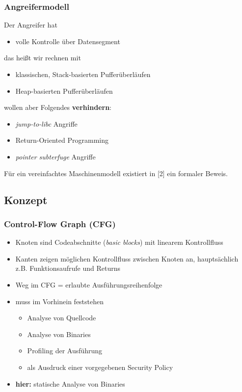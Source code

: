 \documentclass[mathserif,slidestop,compress,red]{beamer}
\begin{document}
\begin{frame}
  \frametitle{Angreifermodell}
  Der Angreifer hat
  \begin{itemize}
    \item volle Kontrolle über Datensegment
  \end{itemize}
  \pause
  das heißt wir rechnen mit
  \begin{itemize}
    \item klassischen, Stack-basierten Pufferüberläufen
    \item Heap-basierten Pufferüberläufen
  \end{itemize}
  \pause
  wollen aber Folgendes \textbf{verhindern}:
  \begin{itemize}
    \item \emph{jump-to-libc} Angriffe
    \item Return-Oriented Programming
    \item \emph{pointer subterfuge} Angriffe
  \end{itemize}
  \vspace{0.5em}
  Für ein vereinfachtes Maschinenmodell existiert in [2] ein formaler Beweis.
\end{frame}

\subsection{Konzept}

\begin{frame}
  \frametitle{Control-Flow Graph (CFG)}
  \begin{itemize}
    \item Knoten sind Codeabschnitte (\emph{basic blocks}) mit linearem Kontrollfluss
    \item Kanten zeigen möglichen Kontrollfluss zwischen Knoten an, hauptsächlich z.B. Funktionsaufrufe und Returns
    \item Weg im CFG = erlaubte Ausführungsreihenfolge
    \item muss im Vorhinein feststehen
    \begin{itemize}
      \item Analyse von Quellcode
      \item Analyse von Binaries
      \item Profiling der Ausführung
      \item als Ausdruck einer vorgegebenen Security Policy
    \end{itemize}
    \item \textbf{hier:} statische Analyse von Binaries
  \end{itemize}
\end{frame}
\end{document}
